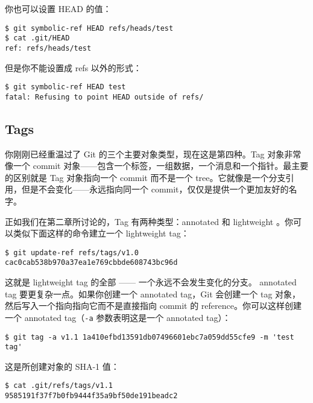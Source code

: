 \documentclass[a4paper]{book}
\begin{document}
你也可以设置 HEAD 的值：

\begin{shaded}\begin{verbatim}
$ git symbolic-ref HEAD refs/heads/test
$ cat .git/HEAD
ref: refs/heads/test
\end{verbatim}\end{shaded}

但是你不能设置成 refs 以外的形式：

\begin{shaded}\begin{verbatim}
$ git symbolic-ref HEAD test
fatal: Refusing to point HEAD outside of refs/
\end{verbatim}\end{shaded}

\subsection{Tags}

你刚刚已经重温过了 Git 的三个主要对象类型，现在这是第四种。Tag 对象非常像一个 commit 对象------包含一个标签，一组数据，一个消息和一个指针。最主要的区别就是 Tag 对象指向一个 commit 而不是一个 tree。它就像是一个分支引用，但是不会变化------永远指向同一个 commit，仅仅是提供一个更加友好的名字。

正如我们在第二章所讨论的，Tag 有两种类型：annotated 和 lightweight 。你可以类似下面这样的命令建立一个 lightweight tag：

\begin{shaded}\begin{verbatim}
$ git update-ref refs/tags/v1.0 cac0cab538b970a37ea1e769cbbde608743bc96d
\end{verbatim}\end{shaded}

这就是 lightweight tag 的全部 ------ 一个永远不会发生变化的分支。 annotated tag 要更复杂一点。如果你创建一个 annotated tag，Git 会创建一个 tag 对象，然后写入一个指向指向它而不是直接指向 commit 的 reference。你可以这样创建一个 annotated tag（\texttt{-a} 参数表明这是一个 annotated tag）：

\begin{shaded}\begin{verbatim}
$ git tag -a v1.1 1a410efbd13591db07496601ebc7a059dd55cfe9 -m 'test tag'
\end{verbatim}\end{shaded}

这是所创建对象的 SHA-1 值：

\begin{shaded}\begin{verbatim}
$ cat .git/refs/tags/v1.1
9585191f37f7b0fb9444f35a9bf50de191beadc2
\end{verbatim}\end{shaded}
\end{document}

